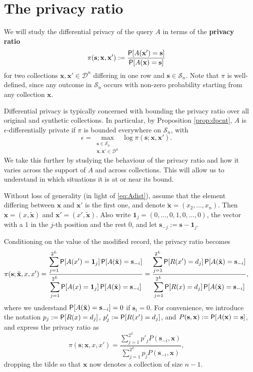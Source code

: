 \documentclass[11pt,draft]{article}
\newcommand{\Dsp}{\mathcal{D}}
\newcommand{\Ssp}{\mathcal{S}}
\newcommand{\xv}{\mathbf{x}}
\newcommand{\sv}{\mathbf{s}}
\newcommand{\xvt}{\tilde{\xv}}
\newcommand{\sm}{\sv^-}
\newcommand{\one}{\boldsymbol{1}}
\begin{document}
\section{The privacy ratio}

We will study the differential privacy of the query $A$ in terms of the \textbf{privacy ratio}
\[ \pi(\sv;\xv,\xv') := \frac{\P[A(\xv') = \sv]}{\P[A(\xv) = \sv]} \]
for two collections $\xv,\xv'\in\Dsp^n$ differing in one row and $\sv \in\Ssp_n$.
Note that $\pi$ is well-defined, since any outcome in $\Ssp_n$ occurs with non-zero probability starting from any collection $\xv$.

Differential privacy is typically concerned with bounding the privacy ratio over all original and synthetic collections.
In particular, by Proposition \ref{prop:dpcnt}, $A$ is $\epsilon$-differentially private if $\pi$ is bounded everywhere on $\Ssp_n$,
with
\[ \epsilon = \max_{\substack{\sv\in\Ssp_n\\ \xv,\xv' \in \Dsp^n}} \log\pi(\sv;\xv,\xv'). \]
We take this further by studying the behaviour of the privacy ratio and how it varies across the support of $A$ and across collections. This will allow us to understand in which situations it is at or near its bound.

Without loss of generality (in light of \eqref{eq:Adist}), assume that the element differing between $\xv$ and $\xv'$ is the first one, and denote $\xvt = (x_2,\dots,x_n)$.
Then $\xv = (x,\xvt)$ and $\xv' = (x', \xvt)$.
Also write $\one_j = (0,\dots,0,1,0,\dots,0)$, the vector with a $1$ in the $j$-th position and the rest $0$, and let $\sv_{-j} := \sv - \one_j$.

Conditioning on the value of the modified record, the privacy ratio becomes
\begin{equation} \label{eq:prcond}
\pi(\sv;\xvt,x,x') = \frac{\displaystyle\sum_{j=1}^{2^L}
\P[A(x') = \one_j] \P[A(\xvt) = \sv_{-i}]}
{\displaystyle\sum_{j=1}^{2^L}
\P[A(x) = \one_j] \P[A(\xvt) = \sv_{-i}]}
= \frac{\displaystyle\sum_{j=1}^{2^L}
\P[R(x') = d_j] \P[A(\xvt) = \sv_{-i}]}
{\displaystyle\sum_{j=1}^{2^L}
\P[R(x) = d_j] \P[A(\xvt) = \sv_{-i}]},
\end{equation}
where we understand $\P[A(\xvt) = \sv_{-i}] = 0$ if $\sv_i = 0$.
For convenience, we introduce the notation $p_j := \P[R(x) = d_j]$,
$p'_j := \P[R(x') = d_j]$, and $P(\sv, \xv) := \P[A(\xv) = \sv]$, and express
the privacy ratio as
\[ \pi(\sv;\xv,x,x') = \frac{\displaystyle\sum_{j=1}^{2^L}
p'_j P(\sv_{-i},\xv)}{\displaystyle\sum_{j=1}^{2^L} p_j P(\sv_{-i},\xv)}, \]
dropping the tilde so that $\xv$ now denotes a collection of size $n-1$.
\end{document}

